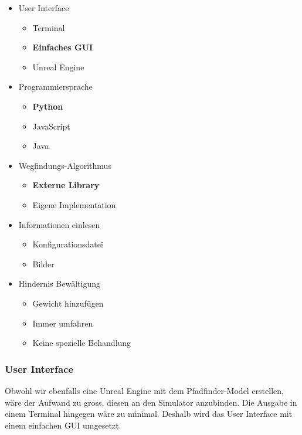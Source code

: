 \documentclass[../main.tex]{subfiles}
\begin{document}
\begin{itemize}
    \item User Interface
        \begin{itemize}
            \item Terminal
            \item \textbf{Einfaches GUI}
            \item Unreal Engine
        \end{itemize}
    \item Programmiersprache
        \begin{itemize}
            \item \textbf{Python}
            \item JavaScript
            \item Java
        \end{itemize}
    \item Wegfindungs-Algorithmus
        \begin{itemize}
            \item \textbf{Externe Library}
            \item Eigene Implementation
        \end{itemize}
    \item Informationen einlesen
        \begin{itemize}
            \item Konfigurationsdatei
            \item Bilder
        \end{itemize}
    \item Hindernis Bewältigung
        \begin{itemize}
            \item Gewicht hinzufügen
            \item Immer umfahren
            \item Keine spezielle Behandlung
        \end{itemize}
\end{itemize}

\subsubsection{User Interface}

Obwohl wir ebenfalls eine Unreal Engine mit dem Pfadfinder-Model erstellen, wäre der Aufwand zu gross, diesen an den Simulator anzubinden. Die Ausgabe in einem Terminal hingegen wäre zu minimal. Deshalb wird das User Interface mit einem einfachen GUI umgesetzt. 
\end{document}
